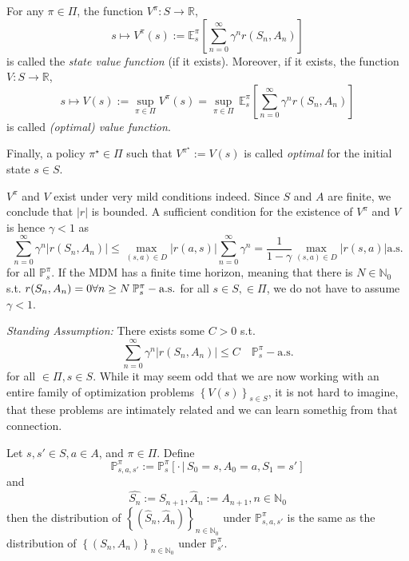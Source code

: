 \begin{definition}[\( V^\pi \qquad V\) ]
    For any \( \pi \in \Pi \), the function \( V^\pi: S \to \mathbb{R} \),
    \[ s \mapsto V^\pi(s) := \mathbb{E}_s^\pi\left[ \sum_{n=0}^{\infty}\gamma^n r(S_n, A_n) \right] \]
    is called the \emph{state value function} (if it exists).
    Moreover, if it exists, the function \( V: S \to \mathbb{R} \), 
    \[
        s \mapsto V(s) := \sup_{\pi \in \Pi} V^\pi (s) = \sup_{\pi \in \Pi}\, \mathbb{E}_{s}^{\pi}\left[ \sum_{n=0}^{\infty} \gamma^n r(S_n, A_n) \right]
    \] 
    is called \emph{(optimal) value function}.

    Finally, a policy \( \pi^\star \in \Pi \) such that \( V^{\pi^\star} := V(s) \) is called \emph{optimal} for the initial state \( s \in S \). 

\end{definition}

\begin{remark}
    \( V^\pi \) and \( V \) exist under very mild conditions indeed. Since \( S \) and \( A \) are finite, we conclude that \( |r| \) is bounded. A sufficient condition for the existence of \( V^\pi \) and \( V \) is hence \( \gamma < 1  \) as 
    \[
        \sum_{n=0}^{\infty} \gamma^n | r(S_n, A_n)| \leq \max_{(s,a) \in D} | r(a,s) | \sum_{n=0}^{\infty} \gamma^n = \frac{1}{1-\gamma} \max_{(s,a) \in D} |r(s,a)| \text{a.s.}
    \]        
    for all \( \mathbb{P}_s^\pi \). If the MDM has a finite time horizon, meaning that there is \( N \in \mathbb{N}_{0} \) s.t. \( r(S_n, A_n) = 0 \forall n \geq N\:  \mathbb{P}_s^\pi-\text{a.s.}\) for all \( s \in S,  \in \Pi \), we do not have to assume \( \gamma < 1 \).

\end{remark}

\emph{Standing Assumption:} There exists some \( C > 0 \) s.t. 
\[
    \sum_{n=0}^{\infty} \gamma^n | r(S_n, A_n)| \leq C\quad  \mathbb{P}_s^\pi-\text{a.s.}
\] 
for all \(  \in \Pi, s \in S\). 
While it may seem odd that we are now working with an entire family of optimization problems \( \left\{ V(s) \right\}_{s \in S} \), it is not hard to imagine, that these problems are intimately related and we can learn somethig from that connection.

\begin{lemma}
    \label{time_shift_lemma}
    Let \( s,s' \in S, a \in A \), and \( \pi \in \Pi \).
    Define 
    \[
        \mathbb{P}_{s,a,s'}^\pi := \mathbb{P}_s^\pi[ \cdot \,|\, S_{0} = s, A_{0} = a, S_{1} = s']
    \] 
    and 
    \[
        \hat{S_n} := S_{n+1}, \hat{A}_n := A_{n+1}, n \in \mathbb{N}_{0}
    \]
    then the distribution of \( \left\{ (\hat{S}_n, \hat{A}_n) \right\}_{n \in \mathbb{N}_{0}} \) under \( \mathbb{P}_{s,a,s'}^\pi \) is the same as the distribution of 
    \( \left\{ (S_n, A_n) \right\}_{n \in \mathbb{N}_{0}} \) under \( \mathbb{P}_{s'}^\pi \).    
\end{lemma}

